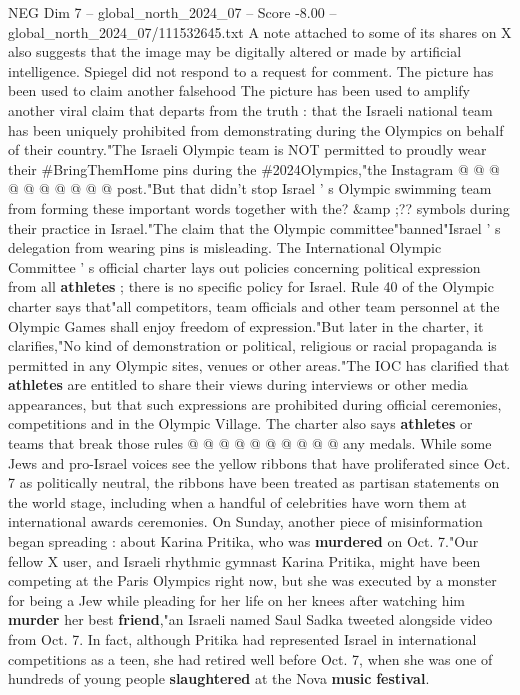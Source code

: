 \begin{textsample}{NEG Dim 7 – global\_north\_2024\_07 – Score -8.00 – global\_north\_2024\_07/111532645.txt}
A note attached to some of its shares on X also suggests that the image may be digitally altered or made by artificial intelligence.
Spiegel did not respond to a request for comment.
The picture has been used to claim another falsehood The picture has been used to amplify another viral claim that departs from the truth : that the Israeli national team has been uniquely prohibited from demonstrating during the Olympics on behalf of their country."The Israeli Olympic team is NOT permitted to proudly wear their \#BringThemHome pins during the \#2024Olympics,"the Instagram @ @ @ @ @ @ @ @ @ @ post."But that didn't stop Israel ' s Olympic swimming team from forming these important words together with the? \&amp ;?? symbols during their practice in Israel."The claim that the Olympic committee"banned"Israel ' s delegation from wearing pins is misleading.
The International Olympic Committee ' s official charter lays out policies concerning political expression from all \textbf{athletes} ; there is no specific policy for Israel.
Rule 40 of the Olympic charter says that"all competitors, team officials and other team personnel at the Olympic Games shall enjoy freedom of expression."But later in the charter, it clarifies,"No kind of demonstration or political, religious or racial propaganda is permitted in any Olympic sites, venues or other areas."The IOC has clarified that \textbf{athletes} are entitled to share their views during interviews or other media appearances, but that such expressions are prohibited during official ceremonies, competitions and in the Olympic Village.
The charter also says \textbf{athletes} or teams that break those rules @ @ @ @ @ @ @ @ @ @ any medals.
While some Jews and pro-Israel voices see the yellow ribbons that have proliferated since Oct. 7 as politically neutral, the ribbons have been treated as partisan statements on the world stage, including when a handful of celebrities have worn them at international awards ceremonies.
On Sunday, another piece of misinformation began spreading : about Karina Pritika, who was \textbf{murdered} on Oct. 7."Our fellow X user, and Israeli rhythmic gymnast Karina Pritika, might have been competing at the Paris Olympics right now, but she was executed by a monster for being a Jew while pleading for her life on her knees after watching him \textbf{murder} her best \textbf{friend},"an Israeli named Saul Sadka tweeted alongside video from Oct. 7.
In fact, although Pritika had represented Israel in international competitions as a teen, she had retired well before Oct. 7, when she was one of hundreds of young people \textbf{slaughtered} at the Nova \textbf{music} \textbf{festival}.

\end{textsample}
